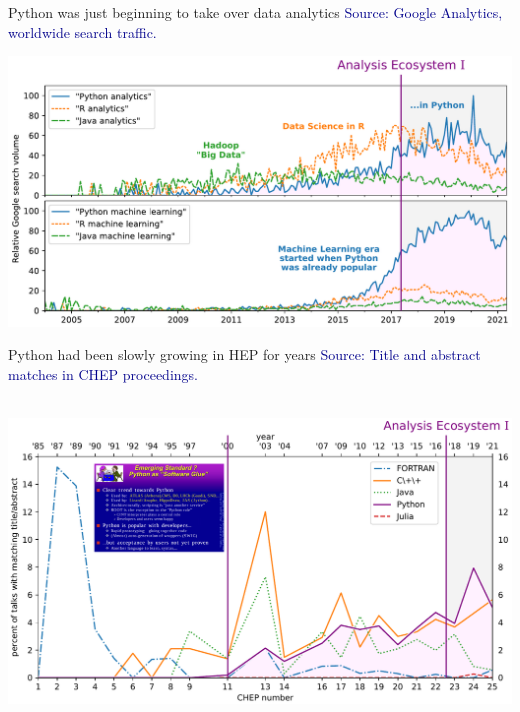 \documentclass[aspectratio=169]{beamer}
\begin{document}
\begin{frame}{Python was just beginning to take over data analytics}
\vspace{0.25 cm}
\textcolor{darkblue}{Source: Google Analytics, worldwide search traffic.}

\vspace{-0.3 cm}
\includegraphics[width=\linewidth]{PLOTS/analytics-by-language.pdf}
\end{frame}

\begin{frame}{Python had been slowly growing in HEP for years}
\vspace{0.25 cm}
\textcolor{darkblue}{Source: Title and abstract matches in CHEP proceedings.}

\vspace{-0.3 cm}
\mbox{ } \hfill \includegraphics[width=0.95\linewidth]{PLOTS/chep-papers-language-2.pdf} \hfill \mbox{ }
\end{frame}
\end{document}
